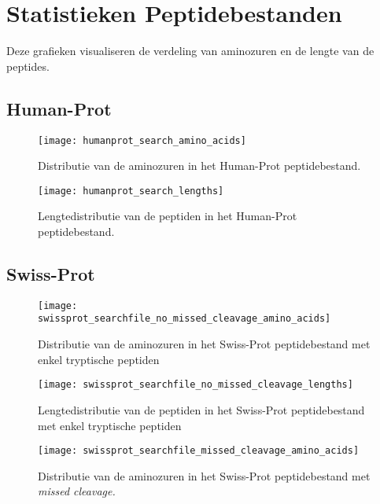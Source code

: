 \chapter{Statistieken Peptidebestanden}\label{ch:appendix-statistieken-peptidebestanden}
Deze grafieken visualiseren de verdeling van aminozuren en de lengte van de peptides.

\section{Human-Prot}\label{sec:human-prot-stats}
\begin{figure}[H]
    \centering
    \texttt{[image: humanprot\_search\_amino\_acids]}
    \caption{Distributie van de aminozuren in het Human-Prot peptidebestand.}
    \label{fig:humanprot_search_amino_acids}
\end{figure}

\begin{figure}[H]
    \centering
    \texttt{[image: humanprot\_search\_lengths]}
    \caption{Lengtedistributie van de peptiden in het Human-Prot peptidebestand.}
    \label{fig:humanprot_search_distr}
\end{figure}

\section{Swiss-Prot}\label{sec:swiss-prot-stats}
\begin{figure}[H]
    \centering
    \texttt{[image: swissprot\_searchfile\_no\_missed\_cleavage\_amino\_acids]}
    \caption{Distributie van de aminozuren in het Swiss-Prot peptidebestand met enkel tryptische peptiden}
    \label{fig:swissprot_search_no_missed_cleavage_amino_acids}
\end{figure}

\begin{figure}[H]
    \centering
    \texttt{[image: swissprot\_searchfile\_no\_missed\_cleavage\_lengths]}
    \caption{Lengtedistributie van de peptiden in het Swiss-Prot peptidebestand met enkel tryptische peptiden}
    \label{fig:swissprot_search_no_missed_cleavage_distr}
\end{figure}

\begin{figure}[H]
    \centering
    \texttt{[image: swissprot\_searchfile\_missed\_cleavage\_amino\_acids]}
    \caption{Distributie van de aminozuren in het Swiss-Prot peptidebestand met \textit{missed cleavage.}}
    \label{fig:swissprot_search_missed_cleavage_amino_acids}
\end{figure}


